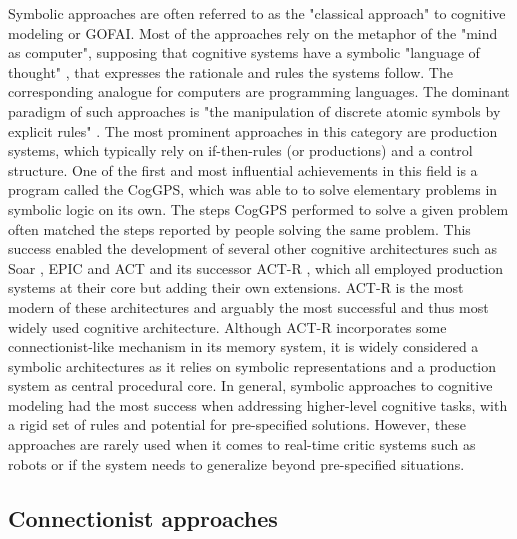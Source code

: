 Symbolic approaches are often referred to as the "classical approach" to cognitive modeling or \acf{GOFAI}.
Most of the approaches rely on the metaphor of the "mind as computer", supposing that cognitive systems have a symbolic "language of thought" \parencite{Fodor1975}, that expresses the rationale and rules the systems follow.
The corresponding analogue for computers are programming languages.
The dominant paradigm of such approaches is "the manipulation of discrete atomic symbols by explicit rules" \parencite{Levy2008}.
The most prominent approaches in this category are production systems, which typically rely on if-then-rules (or productions) and a control structure.
One of the first and most influential achievements in this field is a program called the \ac{CogGPS}, which was able to to solve elementary problems in symbolic logic on its own.
The steps \ac{CogGPS} performed to solve a given problem often matched the steps reported by people solving the same problem.
This success enabled the development of several other cognitive architectures such as Soar \parencite{Laird1987}, \ac{EPIC} \parencite{Kieras1997} and \ac{ACT} \parencite{Anderson1983} and its successor \ac{ACT-R} \parencite{Anderson1996}, which all employed production systems at their core but adding their own extensions.
\ac{ACT-R} is the most modern of these architectures and arguably the most successful and thus most widely used cognitive architecture.
Although \ac{ACT-R} incorporates some connectionist-like mechanism in its memory system, it is widely considered a symbolic architectures as it relies on symbolic representations and a production system as central procedural core.
In general, symbolic approaches to cognitive modeling had the most success when addressing higher-level cognitive tasks, with a rigid set of rules and potential for pre-specified solutions.
However, these approaches are rarely used when it comes to real-time critic systems such as robots or if the system needs to generalize beyond pre-specified situations.

\subsection{Connectionist approaches}%
\label{subsec:connectionist_approaches}

